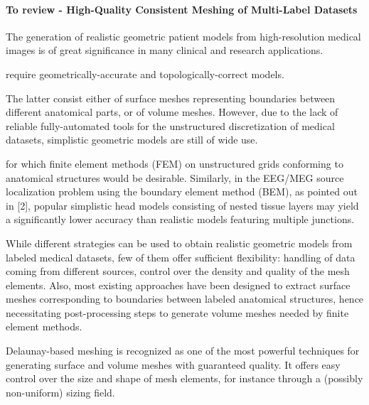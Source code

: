 \paragraph{To review - High-Quality Consistent Meshing of Multi-Label Datasets}
{
The generation of realistic geometric patient models from high-resolution medical images is of great significance in many clinical and research applications. 

require geometrically-accurate and topologically-correct models. 

The latter consist either of surface meshes representing boundaries between different anatomical parts, or of volume meshes. However, due to the lack of reliable fully-automated tools for the unstructured discretization of medical datasets, simplistic geometric models are still of wide use. 

for which finite element methods (FEM) on unstructured grids conforming to anatomical structures would be desirable.
 Similarly, in the EEG/MEG source localization problem using the boundary element method (BEM), as pointed out in [2], popular simplistic head models consisting of nested tissue layers may yield a significantly lower accuracy than realistic models featuring multiple junctions.  

While different strategies can be used to obtain realistic geometric models from labeled medical datasets, few of them offer sufficient flexibility: handling of data coming from different sources, control over the density and quality of the mesh elements. Also, most existing approaches have been designed to extract surface meshes corresponding to boundaries between labeled anatomical structures, hence necessitating post-processing steps to generate volume meshes needed by finite element methods.

Delaunay-based meshing is recognized as one of the most powerful techniques for generating surface and volume meshes with guaranteed quality. It offers easy control over the size and shape of mesh elements, for instance through a (possibly non-uniform) sizing field.

}
